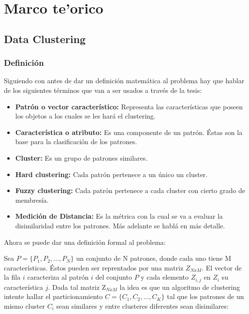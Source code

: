 \chapter{Marco te'orico} \label{chap:dclust}

\vspace{5 mm}

\section{Data Clustering} \label{sect:dclust}

\subsection{Definici\'on} \label{sect:dclustdef} \label{sect:dclustd}

Siguiendo con \cite{SwAjAm2009} antes de dar un definici\'on matem\'atica al problema hay que hablar de 
los siguientes t\'erminos que van a ser usados a trav\'es de la tesis:

\begin{itemize}

\item {\bf Patr\'on o vector caracter\'istico:} Representa las
caracter\'isticas que poseen los objetos a los cuales se les har\'a el clustering.

\item {\bf Caracter\'istica o atributo:} Es una componente de un patr\'on. \'Estas son
la base para la clasificaci\'on de los patrones.

\item {\bf Cluster:} Es un grupo de patrones similares.

\item {\bf Hard clustering:} Cada patr\'on pertenece a un \'unico un cluster.

\item {\bf Fuzzy clustering:} Cada patr\'on pertenece a cada cluster con cierto grado de membres\'ia.

\item {\bf Medici\'on de Distancia:} Es la m\'etrica con la cual se va a evaluar
la disimilaridad entre los patrones. M\'as adelante se habl\'a en m\'as detalle.

\end{itemize}

Ahora se puede dar una definici\'on formal al problema:

Sea $P = \{ P_1, P_2, \dots , P_N\}$ un conjunto de N patrones, 
donde cada uno tiene M caracter\'isticas. Éstos pueden
ser reprentados por una matriz $Z_{NxM}$. El vector de la fila $i$ caracteriza al 
patr\'on $i$ del conjunto $P$ y cada elemento $Z_{i,j}$ en $Z_i$ su caracter\'istica $j$.
Dada tal matriz Z$_{NxM}$ la idea es que un algoritmo de clustering intente hallar
el particionamiento $C = \{ C_1, C_2, \dots , C_K \}$ tal que los patrones
de un mismo cluster $C_i$ sean similares y entre clusteres diferentes
sean disimilares:

